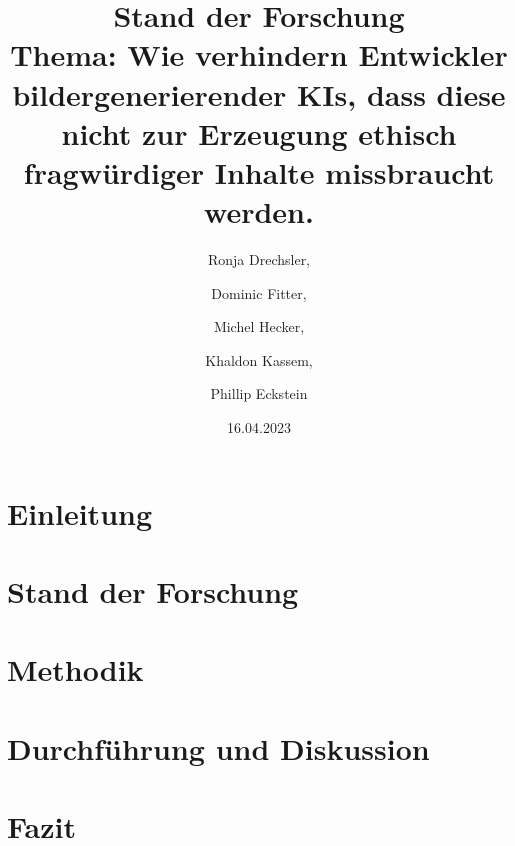 \documentclass[12pt]{article}
\title{Stand der Forschung \\[1ex] \large Thema: Wie verhindern Entwickler bildergenerierender KIs, dass diese nicht zur Erzeugung ethisch fragwürdiger Inhalte missbraucht werden.}
\date{16.04.2023}
\author{Ronja Drechsler, \and Dominic Fitter, \and Michel Hecker, \and Khaldon Kassem, \and Phillip Eckstein}
\begin{document}
\section{Einleitung}
\section{Stand der Forschung}
\section{Methodik}
\section{Durchführung und Diskussion}
\section{Fazit}
\end{document}
